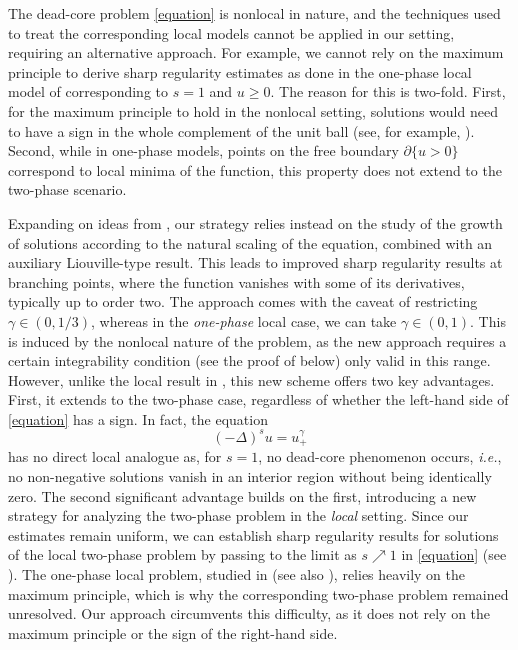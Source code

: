 \documentclass[11pt,reqno]{amsart}
\numberwithin{equation}{section}
\numberwithin{theorem}{section}
\numberwithin{lemma}{section}
\numberwithin{corollary}{section}
\numberwithin{remark}{section}
\numberwithin{proposition}{section}
\numberwithin{definition}{section}
\begin{document}
The dead-core problem \eqref{equation} is nonlocal in nature, and the techniques used to treat the corresponding local models cannot be applied in our setting, requiring an alternative approach. For example, we cannot rely on the maximum principle to derive sharp regularity estimates as done in the one-phase local model of \cite{T16} corresponding to $s=1$ and $u\ge0$. The reason for this is two-fold. First, for the maximum principle to hold in the nonlocal setting, solutions would need to have a sign in the whole complement of the unit ball (see, for example, \cite[Theorem 6.1]{T24}). Second, while in one-phase models, points on the free boundary $\partial\{u>0\}$ correspond to local minima of the function, this property does not extend to the two-phase scenario.

Expanding on ideas from \cite{S15}, our strategy relies instead on the study of the growth of solutions according to the natural scaling of the equation, combined with an auxiliary Liouville-type result. This leads to improved sharp regularity results at branching points, where the function vanishes with some of its derivatives, typically up to order two. The approach comes with the caveat of restricting $\gamma\in(0,1/3)$, whereas in the \textit{one-phase} local case, we can take $\gamma\in(0,1)$. This is induced by the nonlocal nature of the problem, as the new approach requires a certain integrability condition (see the proof of  below) only valid in this range. However, unlike the local result in \cite{T16}, this new scheme offers two key advantages. First, it extends to the two-phase case, regardless of whether the left-hand side of \eqref{equation} has a sign. In fact, the equation 
$$
(-\Delta)^su=u_+^\gamma
$$
has no direct local analogue as, for $s=1$, no dead-core phenomenon occurs, \textit{i.e.}, no non-negative solutions vanish in an interior region without being identically zero. The second significant advantage builds on the first, introducing a new strategy for analyzing the two-phase problem in the \textit{local} setting. Since our estimates remain uniform, we can establish sharp regularity results for solutions of the local two-phase problem by passing to the limit as $s \nearrow 1$ in \eqref{equation} (see ). The one-phase local problem, studied in \cite{T16} (see also \cite{AT24, DT20}), relies heavily on the maximum principle, which is why the corresponding two-phase problem remained unresolved. Our approach circumvents this difficulty, as it does not rely on the maximum principle or the sign of the right-hand side. 
\end{document}
